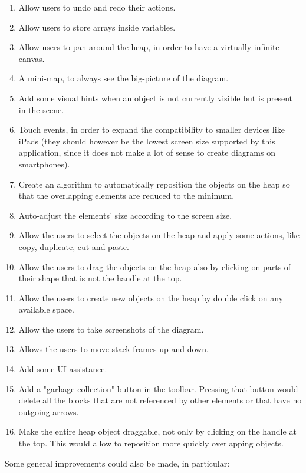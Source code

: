 \documentclass[]{usiinfbachelorproject}
\begin{document}
\begin{enumerate}
	\item Allow users to undo and redo their actions.
	\item Allow users to store arrays inside variables.
	\item Allow users to pan around the heap, in order to have a virtually infinite canvas.
	\item A mini-map, to always see the big-picture of the diagram.
	\item Add some visual hints when an object is not currently visible but is present in the scene.
	\item Touch events, in order to expand the compatibility to 	smaller devices like iPads (they should however be the lowest screen size supported by this application, since it does not make a lot of sense to create diagrams on smartphones).
	\item Create an algorithm to automatically reposition the objects on the heap so that the overlapping elements are reduced to the minimum.
	\item Auto-adjust the elements' size according to the screen size.
	\item Allow the users to select the objects on the heap and apply some actions, like copy, duplicate, cut and paste.
	\item Allow the users to drag the objects on the heap also by clicking on parts of their shape that is not the handle at the top.
	\item Allow the users to create new objects on the heap by double click on any available space.
	\item Allow the users to take screenshots of the diagram.
	\item Allows the users to move stack frames up and down.
	\item Add some UI assistance.
	\item Add a "garbage collection" button in the toolbar. Pressing that button would delete all the blocks that are not referenced by other elements or that have no outgoing arrows.
	\item Make the entire heap object draggable, not only by clicking on the handle at the top. This would allow to reposition more quickly overlapping objects. 
\end{enumerate}

\noindent Some general improvements could also be made, in particular:
\end{document}
